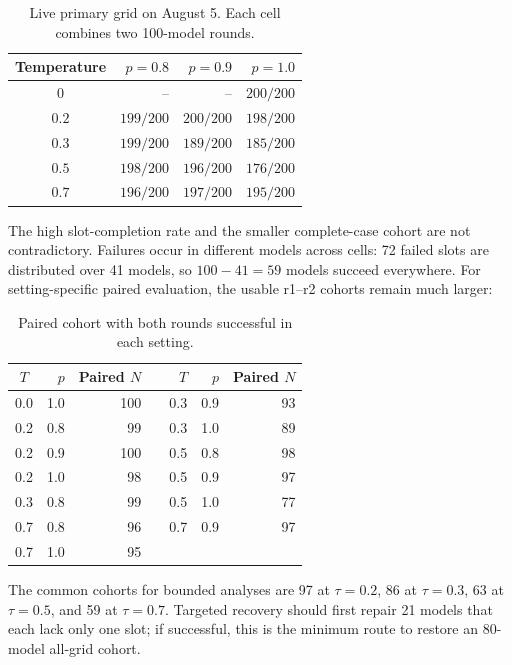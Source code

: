 \documentclass[11pt,a4paper]{article}
\begin{document}
\begin{table}[htbp]
\centering
\caption{Live primary grid on August 5. Each cell combines two 100-model rounds.}
\label{tab:live-grid}
\begin{tabular}{crrr}
\toprule
Temperature & $p=0.8$ & $p=0.9$ & $p=1.0$ \\
\midrule
$0$   & -- & -- & $200/200$ \\
$0.2$ & $199/200$ & $200/200$ & $198/200$ \\
$0.3$ & $199/200$ & $189/200$ & $185/200$ \\
$0.5$ & $198/200$ & $196/200$ & $176/200$ \\
$0.7$ & $196/200$ & $197/200$ & $195/200$ \\
\bottomrule
\end{tabular}
\end{table}

The high slot-completion rate and the smaller complete-case cohort are not
contradictory. Failures occur in different models across cells: 72 failed slots
are distributed over 41 models, so $100-41=59$ models succeed everywhere.
For setting-specific paired evaluation, the usable r1--r2 cohorts remain much
larger:

\begin{table}[htbp]
\centering
\small
\caption{Paired cohort with both rounds successful in each setting.}
\label{tab:paired-cohorts}
\begin{tabular}{crrcrrr}
\toprule
$T$ & $p$ & Paired $N$ && $T$ & $p$ & Paired $N$ \\
\midrule
0.0 & 1.0 & 100 && 0.3 & 0.9 & 93 \\
0.2 & 0.8 & 99  && 0.3 & 1.0 & 89 \\
0.2 & 0.9 & 100 && 0.5 & 0.8 & 98 \\
0.2 & 1.0 & 98  && 0.5 & 0.9 & 97 \\
0.3 & 0.8 & 99  && 0.5 & 1.0 & 77 \\
0.7 & 0.8 & 96  && 0.7 & 0.9 & 97 \\
0.7 & 1.0 & 95  &&     &     &    \\
\bottomrule
\end{tabular}
\end{table}

The common cohorts for bounded analyses are 97 at $\tau=0.2$, 86 at
$\tau=0.3$, 63 at $\tau=0.5$, and 59 at $\tau=0.7$. Targeted recovery should
first repair 21 models that each lack only one slot; if successful, this is the
minimum route to restore an 80-model all-grid cohort.
\end{document}
